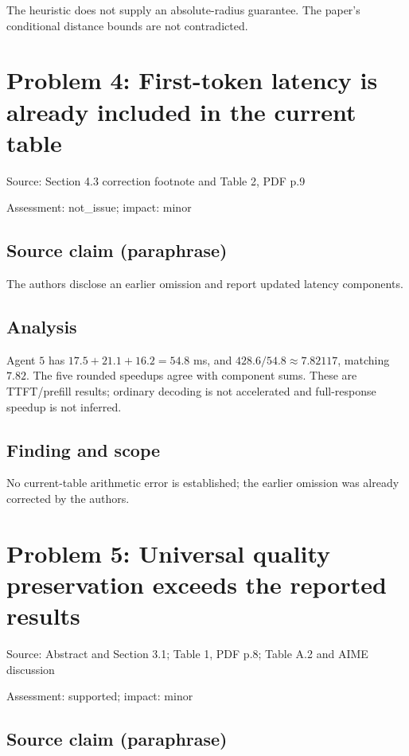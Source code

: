 \documentclass[11pt]{article}
\begin{document}
The heuristic does not supply an absolute-radius guarantee. The paper’s conditional distance bounds are not contradicted.

\section*{Problem 4: First-token latency is already included in the current table}

Source: Section 4.3 correction footnote and Table 2, PDF p.9

Assessment: not\_issue; impact: minor

\subsection*{Source claim (paraphrase)}

The authors disclose an earlier omission and report updated latency components.

\subsection*{Analysis}

Agent \(5\) has \(17.5+21.1+16.2=54.8\) ms, and \(428.6/54.8\approx7.82117\), matching \(7.82\). The five rounded speedups agree with component sums. These are TTFT/prefill results; ordinary decoding is not accelerated and full-response speedup is not inferred.

\subsection*{Finding and scope}

No current-table arithmetic error is established; the earlier omission was already corrected by the authors.

\section*{Problem 5: Universal quality preservation exceeds the reported results}

Source: Abstract and Section 3.1; Table 1, PDF p.8; Table A.2 and AIME discussion

Assessment: supported; impact: minor

\subsection*{Source claim (paraphrase)}
\end{document}
